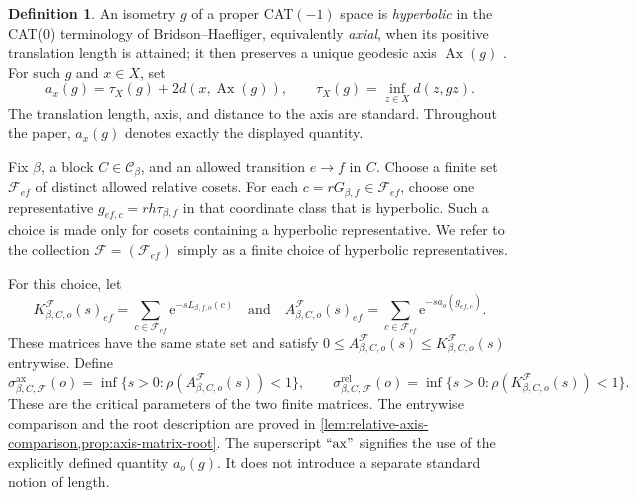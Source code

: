 \documentclass[11pt]{article}
\theoremstyle{definition}
\newtheorem*{definition*}{Definition}
\newcommand{\Ax}{\operatorname{Ax}}
\newcommand{\ax}{\mathrm{ax}}
\newcommand{\rel}{\mathrm{rel}}
\newcommand{\e}{\mathrm e}
\begin{document}
\begin{definition*}
An isometry $g$ of a proper CAT$(-1)$ space is \emph{hyperbolic} in the CAT(0) terminology
of Bridson--Haefliger, equivalently \emph{axial}, when its positive translation length is
attained; it then preserves a unique geodesic axis $\Ax(g)$
\cite[Chapter~II.6, Definition~6.3 and Theorem~6.8]{BridsonHaefliger1999}.  For such $g$ and
$x\in X$, set
\begin{equation}\label{eq:intro-axis-bound}
 a_x(g)=\tau_X(g)+2d(x,\Ax(g)),
 \qquad \tau_X(g)=\inf_{z\in X}d(z,gz).
\end{equation}
The translation length, axis, and distance to the axis are standard.  Throughout the paper,
$a_x(g)$ denotes exactly the displayed quantity.

Fix $\beta$, a block $C\in\mathscr C_\beta$, and an allowed transition $e\to f$ in $C$.
Choose a finite set $\mathcal F_{ef}$ of distinct allowed relative cosets.  For each
$c=rG_{\beta,f}\in\mathcal F_{ef}$, choose one representative
$g_{ef,c}=rh\tau_{\beta,f}$ in that coordinate class that is hyperbolic.  Such a choice is
made only for cosets containing a hyperbolic representative.  We refer to the collection
$\mathcal F=(\mathcal F_{ef})$ simply as a finite choice of hyperbolic representatives.

For this choice, let
\[
 K^{\mathcal F}_{\beta,C,o}(s)_{ef}=
 \sum_{c\in\mathcal F_{ef}}\e^{-sL_{\beta,f,o}(c)}
 \quad\text{and}\quad
 A^{\mathcal F}_{\beta,C,o}(s)_{ef}=
 \sum_{c\in\mathcal F_{ef}}\e^{-sa_o(g_{ef,c})}.
\]
These matrices have the same state set and satisfy
$0\le A^{\mathcal F}_{\beta,C,o}(s)\le K^{\mathcal F}_{\beta,C,o}(s)$ entrywise.  Define
\[
 \sigma^{\ax}_{\beta,C,\mathcal F}(o)=
 \inf\{s>0:\rho(A^{\mathcal F}_{\beta,C,o}(s))<1\},
 \qquad
 \sigma^{\rel}_{\beta,C,\mathcal F}(o)=
 \inf\{s>0:\rho(K^{\mathcal F}_{\beta,C,o}(s))<1\}.
\]
These are the critical parameters of the two finite matrices.
The entrywise comparison and the root description are proved in
\cref{lem:relative-axis-comparison,prop:axis-matrix-root}.  The superscript $``\ax"$ signifies the use of the explicitly defined quantity $a_o(g)$. It does
not introduce a separate standard notion of length.
\end{definition*}
\end{document}
